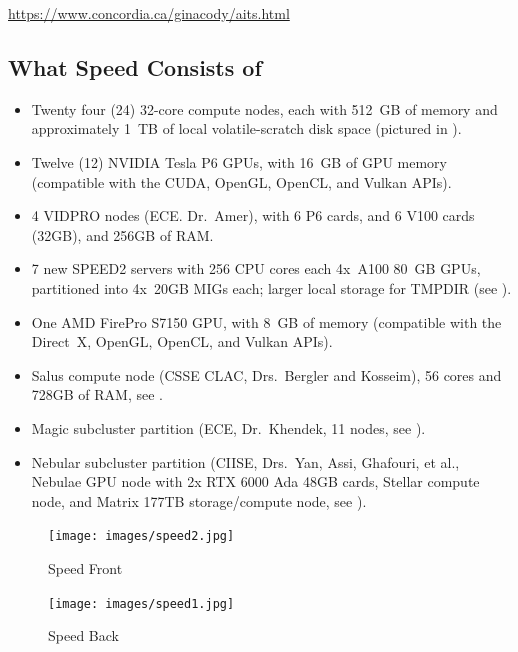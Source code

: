 \url{https://www.concordia.ca/ginacody/aits.html}

\subsection{What Speed Consists of}
\label{sect:speed-arch}

\begin{itemize}
	\item Twenty four (24) 32-core compute nodes, each with 512~GB of memory and
	approximately 1~TB of local volatile-scratch disk space (pictured in ).

	\item Twelve (12) NVIDIA Tesla P6 GPUs, with 16~GB of GPU memory (compatible with the
	CUDA, OpenGL, OpenCL, and Vulkan APIs).

	\item 4 VIDPRO nodes (ECE. Dr.~Amer), with 6 P6 cards, and 6 V100 cards (32GB), and
	256GB of RAM.

	\item 7 new SPEED2 servers with 256 CPU cores each 4x~A100 80~GB GPUs, partitioned
	into 4x~20GB MIGs each; larger local storage for TMPDIR (see ).

	\item One AMD FirePro S7150 GPU, with 8~GB of memory (compatible with the
	Direct~X, OpenGL, OpenCL, and Vulkan APIs).

 	\item Salus compute node (CSSE CLAC, Drs.~Bergler and Kosseim), 56 cores and 728GB of RAM,
	see .

	\item Magic subcluster partition (ECE, Dr.~Khendek, 11 nodes, see ).

	\item Nebular subcluster partition (CIISE, Drs.~Yan, Assi, Ghafouri, et al., Nebulae GPU node with 2x RTX 6000 Ada 48GB cards,
	Stellar compute node, and Matrix 177TB storage/compute node, see ).
\end{itemize}

\begin{figure}[htbp]
    \centering
    \begin{minipage}[b]{0.49\columnwidth}
        \centering
        \texttt{[image: images/speed2.jpg]}
        \caption{Speed Front}
        \label{fig:speed-front}
    \end{minipage}
    \hfill
    \begin{minipage}[b]{0.49\columnwidth}
        \centering
        \texttt{[image: images/speed1.jpg]}
        \caption{Speed Back}
        \label{fig:speed-back}
    \end{minipage}
\end{figure}

